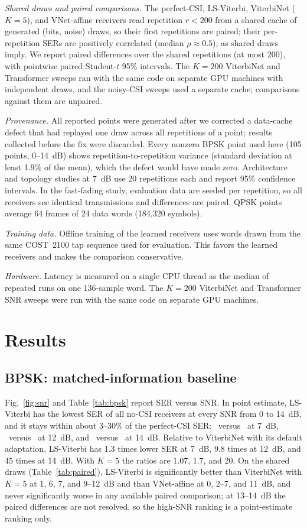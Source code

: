 \documentclass[journal]{IEEEtran}
\begin{document}
\emph{Shared draws and paired comparisons.} The perfect-CSI, LS-Viterbi, ViterbiNet ($K=5$), and VNet-affine receivers read repetition $r<200$ from a shared cache of generated (bits, noise) draws, so their first repetitions are paired; their per-repetition SERs are positively correlated (median $\rho\approx0.5$), as shared draws imply. We report paired differences over the shared repetitions (at most 200), with pointwise paired Student-$t$ 95\% intervals. The $K=200$ ViterbiNet and Transformer sweeps ran with the same code on separate GPU machines with independent draws, and the noisy-CSI sweeps used a separate cache; comparisons against them are unpaired.

\emph{Provenance.} All reported points were generated after we corrected a data-cache defect that had replayed one draw across all repetitions of a point; results collected before the fix were discarded. Every nonzero BPSK point used here (105 points, 0--14~dB) shows repetition-to-repetition variance (standard deviation at least 1.9\% of the mean), which the defect would have made zero. Architecture and topology studies at 7~dB use 20 repetitions each and report 95\% confidence intervals. In the fast-fading study, evaluation data are seeded per repetition, so all receivers see identical transmissions and differences are paired. QPSK points average 64 frames of 24 data words (184,320 symbols).

\emph{Training data.} Offline training of the learned receivers uses words drawn from the same COST~2100 tap sequence used for evaluation. This favors the learned receivers and makes the comparison conservative.

\emph{Hardware.} Latency is measured on a single CPU thread as the median of repeated runs on one 136-sample word. The $K=200$ ViterbiNet and Transformer SNR sweeps were run with the same code on separate GPU machines.

\section{Results}
\subsection{BPSK: matched-information baseline}\label{sec:bpsk}
Fig.~\ref{fig:snr} and Table~\ref{tab:bpsk} report SER versus SNR. In point estimate, LS-Viterbi has the lowest SER of all no-CSI receivers at every SNR from 0 to 14~dB, and it stays within about 3--30\% of the perfect-CSI SER: \serlsseven\ versus \sercsiseven\ at 7~dB, \serlstwelve\ versus \sercsitwelve\ at 12~dB, and \serlsfourteen\ versus \sercsifourteen\ at 14~dB. Relative to ViterbiNet with its default adaptation, LS-Viterbi has 1.3 times lower SER at 7~dB, 9.8 times at 12~dB, and 45 times at 14~dB. With $K=5$ the ratios are 1.07, 1.7, and 20. On the shared draws (Table~\ref{tab:paired}), LS-Viterbi is significantly better than ViterbiNet with $K=5$ at 1, 6, 7, and 9--12~dB and than VNet-affine at 0, 2--7, and 11~dB, and never significantly worse in any available paired comparison; at 13--14~dB the paired differences are not resolved, so the high-SNR ranking is a point-estimate ranking only.
\end{document}
